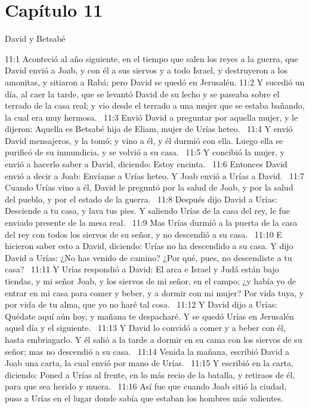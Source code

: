 \section*{Capítulo 11}
David y Betsabé  

11:1 Aconteció al año siguiente, en el tiempo que salen los reyes a la guerra, que David envió a Joab, y con él a sus siervos y a todo Israel, y destruyeron a los amonitas, y sitiaron a Rabá; pero David se quedó en Jerusalén. 
11:2 Y sucedió un día, al caer la tarde, que se levantó David de su lecho y se paseaba sobre el terrado de la casa real; y vio desde el terrado a una mujer que se estaba bañando, la cual era muy hermosa.  
11:3 Envió David a preguntar por aquella mujer, y le dijeron: Aquella es Betsabé hija de Eliam, mujer de Urías heteo.  
11:4 Y envió David mensajeros, y la tomó; y vino a él, y él durmió con ella. Luego ella se purificó de su inmundicia, y se volvió a su casa.  
11:5 Y concibió la mujer, y envió a hacerlo saber a David, diciendo: Estoy encinta.  
11:6 Entonces David envió a decir a Joab: Envíame a Urías heteo. Y Joab envió a Urías a David.  
11:7 Cuando Urías vino a él, David le preguntó por la salud de Joab, y por la salud del pueblo, y por el estado de la guerra.  
11:8 Después dijo David a Urías: Desciende a tu casa, y lava tus pies. Y saliendo Urías de la casa del rey, le fue enviado presente de la mesa real.  
11:9 Mas Urías durmió a la puerta de la casa del rey con todos los siervos de su señor, y no descendió a su casa.  
11:10 E hicieron saber esto a David, diciendo: Urías no ha descendido a su casa. Y dijo David a Urías: ¿No has venido de camino? ¿Por qué, pues, no descendiste a tu casa?  
11:11 Y Urías respondió a David: El arca e Israel y Judá están bajo tiendas, y mi señor Joab, y los siervos de mi señor, en el campo; ¿y había yo de entrar en mi casa para comer y beber, y a dormir con mi mujer? Por vida tuya, y por vida de tu alma, que yo no haré tal cosa.  
11:12 Y David dijo a Urías: Quédate aquí aún hoy, y mañana te despacharé. Y se quedó Urías en Jerusalén aquel día y el siguiente.  
11:13 Y David lo convidó a comer y a beber con él, hasta embriagarlo. Y él salió a la tarde a dormir en su cama con los siervos de su señor; mas no descendió a su casa.  
11:14 Venida la mañana, escribió David a Joab una carta, la cual envió por mano de Urías.  
11:15 Y escribió en la carta, diciendo: Poned a Urías al frente, en lo más recio de la batalla, y retiraos de él, para que sea herido y muera.  
11:16 Así fue que cuando Joab sitió la ciudad, puso a Urías en el lugar donde sabía que estaban los hombres más valientes.  
